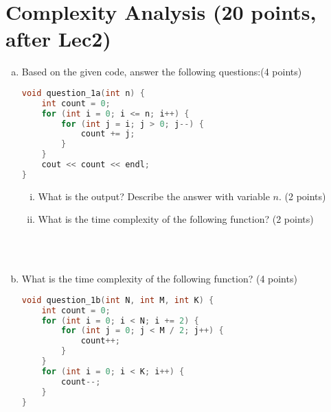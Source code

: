 \documentclass[11pt]{exam}
\begin{document}
\section{Complexity Analysis (20 points, after Lec2)}

\begin{enumerate}[(a)]

\item Based on the given code, answer the following questions:(4 points)
\begin{lstlisting}[language=c++]
void question_1a(int n) {
	int count = 0;
	for (int i = 0; i <= n; i++) {
	 	for (int j = i; j > 0; j--) {
	 		count += j;
	    }
	}
	cout << count << endl;
}
\end{lstlisting}
\begin{enumerate}[i)]
\item What is the output? Describe the answer with variable $n$. (2 points)
\item What is the time complexity of the following function? (2 points)
\end{enumerate}

\begin{solution}
~\\
~\\
\end{solution}

\item What is the time complexity of the following function? (4 points)
\begin{lstlisting}[language=c++]
void question_1b(int N, int M, int K) {
	int count = 0;
	for (int i = 0; i < N; i += 2) {
		for (int j = 0; j < M / 2; j++) {
			count++;
		}
	}
	for (int i = 0; i < K; i++) {
		count--;
	}
}
\end{lstlisting}

\begin{solution}
~\\
~\\
~\\
~\\
\end{solution}


\end{enumerate}
\end{document}
